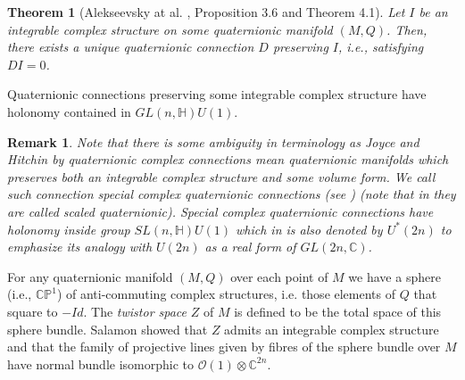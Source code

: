 \documentclass{amsart}
\newtheorem{thm}{Theorem}[section]
\newtheorem{rem}{Remark}[section]
\begin{document}
\begin{thm}[Alekseevsky at al. \cite{AMP}, Proposition 3.6 and Theorem 4.1] Let $I$ be an integrable complex structure on  some quaternionic manifold $(M,Q)$. Then, there exists a unique quaternionic connection $D$ preserving $I$, i.e., satisfying $DI=0$.
    
\end{thm}

Quaternionic connections preserving some integrable complex structure have holonomy contained in $GL(n,\mathbb{H})U(1)$.
\begin{rem}
    

Note that there is some ambiguity in terminology as Joyce \cite{Joyce} and Hitchin \cite{Hit3} by  quaternionic complex connections mean quaternionic manifolds which preserves both an integrable complex structure  and some volume form. We call such connection special complex quaternionic connections (see \cite{BC}) (note that in \cite{T} they are called scaled quaternionic). Special complex quaternionic connections have holonomy inside group $SL(n,\mathbb{H})U(1)$ which in \cite{Hit3} is also denoted by $U^*(2n)$ to emphasize its analogy with $U(2n)$ as a real form of $GL(2n,\mathbb{C})$.
\end{rem}

For any quaternionic manifold $(M,Q)$  over each point of $M$ we have a sphere (i.e., $\mathbb{CP}^1$) of anti-commuting complex structures, i.e. those elements of $Q$ that square to $-Id$. The \emph{twistor space} $Z$ of $M$ is defined to be the total space of this sphere bundle. Salamon \cite{SAL} showed that $Z$ admits an integrable complex structure and that the family of projective lines given by fibres of the sphere bundle over $M$ have normal bundle isomorphic to $\mathcal{O}(1)\otimes\mathbb{C}^{2n}$.
\end{document}
